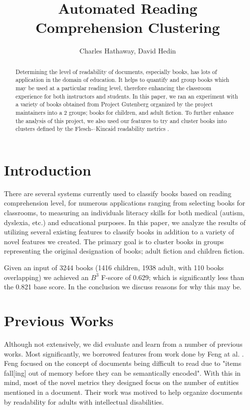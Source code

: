 \documentclass[]{article}
\title{Automated Reading Comprehension Clustering}
\author{Charles Hathaway, David Hedin}
\begin{document}
\maketitle

\begin{abstract}

Determining the level of readability of documents, especially books, has lots of application in the domain of education.
It helps to quantify and group books which may be used at a particular reading level, therefore enhancing the classroom experience for both instructors and students.
In this paper, we ran an experiment with a variety of books obtained from Project Gutenberg \cite{gutenberg2015} organized by the project maintainers into a 2 groups; books for children, and adult fiction.
To further enhance the analysis of this project, we also used our features to try and cluster books into clusters defined by the Flesch-–Kincaid readability metrics \cite{kincaid1975derivation}.

\end{abstract}

\section{Introduction}

There are several systems currently used to classify books based on reading comprehension level, for numerous applications ranging from selecting books for classrooms, to measuring an individuals literacy skills for both medical (autism, dyslexia, etc.) and educational purposes.
In this paper, we analyze the results of utilizing several existing features to classify books in addition to a variety of novel features we created.
The primary goal is to cluster books in groups representing the original designation of books; adult fiction and children fiction.

Given an input of 3244 books (1416 children, 1938 adult, with 110 books overlapping) we achieved an $B^3$ F-score of 0.629; which is significantly less than the 0.821 base score.
In the conclusion we discuss reasons for why this may be.

\section{Previous Works}

Although not extensively, we did evaluate and learn from a number of previous works.
Most significantly, we borrowed features from work done by Feng at al. \cite{feng2009cognitively}.
Feng focused on the concept of documents being difficult to read due to "items fall[ing] out of memory before they can be semantically encoded".
With this in mind, most of the novel metrics they designed focus on the number of entities mentioned in a document.
Their work was motived to help organize documents by readability for adults with intellectual disabilities.
\end{document}
